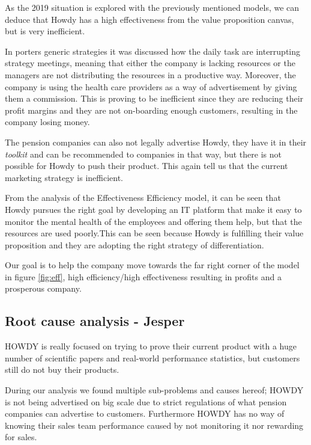 As the 2019 situation is explored with the previously mentioned models, we can deduce that Howdy has a high effectiveness from the value proposition canvas, but is very inefficient. 

\noindent In porters generic strategies it was discussed how the daily task are interrupting strategy meetings, meaning that either the company is lacking resources or the managers are not distributing the resources in a productive way. Moreover, the company is using the health care providers as a way of advertisement by giving them a commission. This is proving to be inefficient since they are reducing their profit margins and they are not on-boarding enough customers, resulting in the company losing money.

\noindent The pension companies can also not legally advertise Howdy, they have it in their \textit{toolkit} and can be recommended to companies in that way, but there is not possible for Howdy to push their product. This again tell us that the current marketing strategy is inefficient. 

\noindent From the analysis of the Effectiveness Efficiency model, it can be seen that Howdy pursues the right goal by developing an IT platform that make it easy to monitor the mental health of the employees and offering them help, but that the resources
are used poorly.This can be seen because Howdy is fulfilling their value proposition and they are adopting the right strategy of differentiation.

\noindent Our goal is to help the company move towards the far right corner of the model in figure \ref{fig:eff}, high efficiency/high effectiveness resulting in profits and a prosperous company. 



\subsection{Root cause analysis - Jesper}
HOWDY is really focused on trying to prove their current product with a huge number of scientific papers and real-world performance statistics, but customers still do not buy their products. 

During our analysis we found multiple sub-problems and causes hereof; HOWDY is not being advertised on big scale due to strict regulations of what pension companies can advertise to customers. Furthermore HOWDY has no way of knowing their sales team performance caused by not monitoring it nor rewarding for sales.


